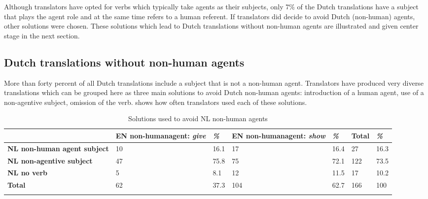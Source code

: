 \documentclass[output=paper]{LSP/langsci}
\begin{document}


Although translators have opted for verbs which typically take agents as their subjects, only 7\% of the Dutch translations have a subject that plays the agent role and at the same time refers to a human referent. If translators did decide to avoid Dutch (non-human) agents, other solutions were chosen. These solutions which lead to Dutch translations without non-human agents are illustrated and given center stage in the next section.  

\subsection{Dutch translations without non-human agents} \label{sec:5:6:2}
More than forty percent of all Dutch translations include a subject that is not a non-human agent. Translators have produced very diverse translations which can be grouped here as three main solutions to avoid Dutch non-human agents: introduction of a human agent, use of a non-agentive subject, omission of the verb.  shows how often translators used each of these solutions. 

\begin{table}
     \centering
     \begin{tabularx}{\textwidth}{XXXXXXX}
     \lsptoprule
                  &  EN non-human\newline agent: \textit{give}   & \textit{\%}  & EN non-human\newline agent: \textit{show}  & \textit{\%} & Total & \textit{\%} \\ \midrule
       \textbf{NL non-human agent subject}  & 10          & 16.1     & 17	          & 16.4      & 27   & 16.3 \\
       \textbf{NL non-agentive subject}     & 47          & 75.8     & 75             & 72.1       & 122   & 73.5  \\
       \textbf{NL no verb}           & 5    & 8.1         & 12       & 11.5       & 17   & 10.2 \\  \midrule
       \textbf{Total}                & 62   & 37.3        & 104      & 62.7       & 166   & 100  \\ 
       
     \lspbottomrule
     \end{tabularx}
 
     \caption{Solutions used to avoid NL non-human agents}
     \label{tab:5:3}
 
   \end{table}
\end{document}
